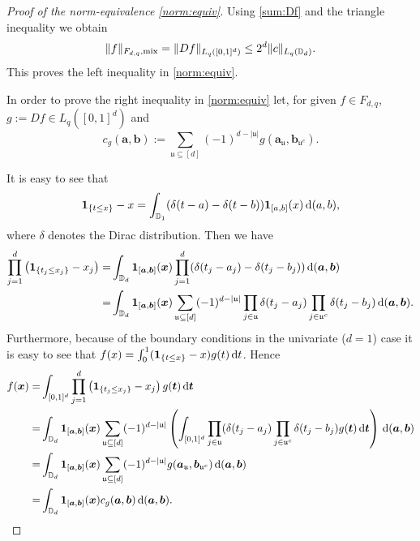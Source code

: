 \documentclass[12pt]{article}
\theoremstyle{remark}
\theoremstyle{definition}
\newcommand{\D}{\mathbb{D}}
\newcommand{\mx}{{\rm mix}}
\newcommand{\rd}{\,{\rm d}}
\newcommand{\bsx}{{\boldsymbol x}}
\newcommand{\bst}{{\boldsymbol t}}
\newcommand{\bsa}{{\boldsymbol a}}
\newcommand{\bsb}{{\boldsymbol b}}
\newcommand{\uu}{\mathfrak{u}}
\newcommand{\<}{\langle}
\renewcommand{\>}{\rangle}
\begin{document}
\begin{appendix}
\begin{proof}[Proof of the norm-equivalence \eqref{norm:equiv}]
Using \eqref{sum:Df} and the triangle inequality we obtain 
\begin{equation*}\label{bd:norm:u}
\|f\|_{F_{d,q},\mx}=\|D f\|_{L_q([0,1]^d)} \le 2^d \|c\|_{L_q(\D_d)}.
\end{equation*}
This proves the left inequality in \eqref{norm:equiv}.


In order to prove the right inequality in \eqref{norm:equiv} let, for given $f \in F_{d,q}$, $g:=Df \in L_q([0,1]^d)$ and 
\begin{equation}\label{def:cg}
c_g(\bsa,\bsb):=\sum_{\uu \subseteq [d]}(-1)^{d-|\uu|} g(\bsa_{\uu},\bsb_{\uu^c}).
\end{equation}

It is easy to see that $${\bf 1}_{\{t \le x\}}-x = \int_{\D_1} (\delta(t-a)-\delta(t-b)) {\bf 1}_{[a,b]}(x) \rd (a,b),$$ where $\delta$ denotes the Dirac distribution. Then we have 
\begin{align*}
\prod_{j=1}^d \left({\bf 1}_{\{t_j \le x_j\}}-x_j\right) = & \int_{\D_d} {\bf 1}_{[\bsa,\bsb]}(\bsx) \prod_{j=1}^d (\delta(t_j-a_j)-\delta(t_j-b_j)) \rd (\bsa,\bsb)\\
= & \int_{\D_d} {\bf 1}_{[\bsa,\bsb]}(\bsx) \sum_{\uu \subseteq [d]} (-1)^{d-|\uu|} \prod_{j \in \uu} \delta(t_j-a_j) \prod_{j \in \uu^c} \delta(t_j-b_j) \rd (\bsa,\bsb).
\end{align*}
Furthermore, because of the boundary conditions in the univariate ($d=1$) case it is easy to see that $f(x)=\int_0^1 ({\bf 1}_{\{t \le x\}}-x) g(t)\rd t$. Hence
\begin{align*}
f(\bsx) = & \int_{[0,1]^d} \prod_{j=1}^d \left({\bf 1}_{\{t_j \le x_j\}}-x_j\right) g(\bst) \rd \bst\\
= & \int_{\D_d} {\bf 1}_{[\bsa,\bsb]}(\bsx) \sum_{\uu \subseteq [d]} (-1)^{d-|\uu|} \left( \int_{[0,1]^d} \prod_{j \in \uu} (\delta(t_j-a_j) \prod_{j \in \uu^c} \delta(t_j-b_j) g(\bst)\rd \bst\right) \rd (\bsa,\bsb)\\
= & \int_{\D_d} {\bf 1}_{[\bsa,\bsb]}(\bsx) \sum_{\uu \subseteq [d]} (-1)^{d-|\uu|} g(\bsa_{\uu},\bsb_{\uu^c}) \rd (\bsa,\bsb)\\
= & \int_{\D_d} {\bf 1}_{[\bsa,\bsb]}(\bsx) c_g(\bsa,\bsb) \rd (\bsa,\bsb).
\end{align*}


\end{proof}
\end{appendix}
\end{document}
